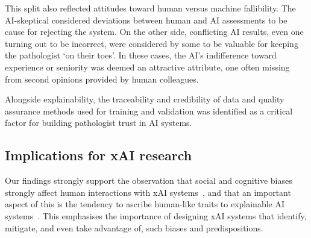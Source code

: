 
This split also reflected attitudes toward human versus machine fallibility. The AI-skeptical considered deviations between human and AI assessments to be cause for rejecting the system. On the other side, conflicting AI results, even one turning out to be incorrect, were considered by some to be valuable for keeping the pathologist `on their toes'. In these cases, the AI's indifference toward experience or seniority was deemed an attractive attribute, one often missing from second opinions provided by human colleagues.


Alongside explainability, the traceability and credibility of data and quality assurance methods used for training and validation was identified as a critical factor for building pathologist trust in AI systems.

\subsection{Implications for xAI research}



Our findings strongly support the observation that social and cognitive biases strongly affect human interactions with xAI systems~\cite{miller2019explanation, jussupow2021augmenting}, and that an important aspect of this is the tendency to ascribe human-like traits to explainable AI systems~\citet{de2017people, miller2019explanation}. This emphasises the importance of designing xAI systems that identify, mitigate, and even take advantage of, such biases and predispositions.


